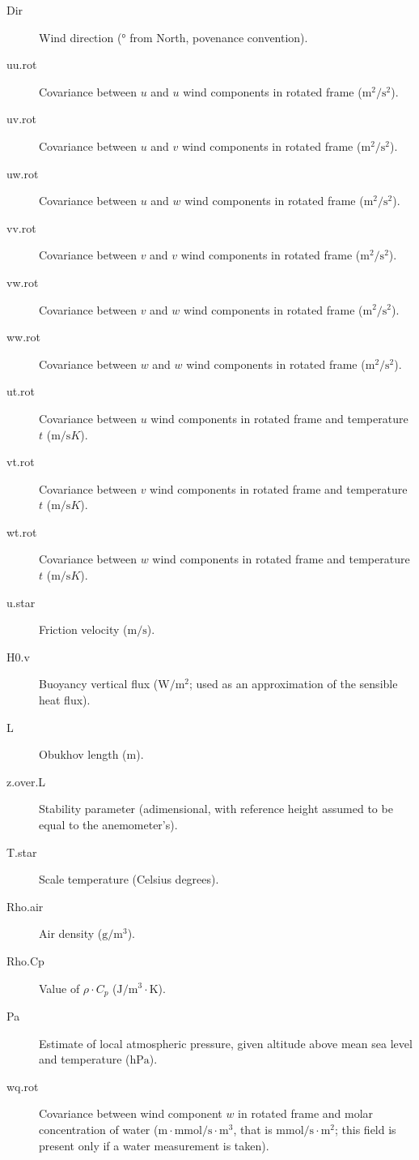 \documentclass[a4paper,10pt]{book}
\begin{document}
\begin{description}
 \item[Dir] Wind direction (° from North, povenance convention).
 \item[uu.rot] Covariance between $u$ and $u$ wind components in rotated frame ($\mbox{m}^2/\mbox{s}^2$).
 \item[uv.rot] Covariance between $u$ and $v$ wind components in rotated frame ($\mbox{m}^2/\mbox{s}^2$).
 \item[uw.rot] Covariance between $u$ and $w$ wind components in rotated frame ($\mbox{m}^2/\mbox{s}^2$).
 \item[vv.rot] Covariance between $v$ and $v$ wind components in rotated frame ($\mbox{m}^2/\mbox{s}^2$).
 \item[vw.rot] Covariance between $v$ and $w$ wind components in rotated frame ($\mbox{m}^2/\mbox{s}^2$).
 \item[ww.rot] Covariance between $w$ and $w$ wind components in rotated frame ($\mbox{m}^2/\mbox{s}^2$).
 \item[ut.rot] Covariance between $u$  wind components in rotated frame and temperature $t$ ($\mbox{m}/\mbox{s} K$).
 \item[vt.rot] Covariance between $v$  wind components in rotated frame and temperature $t$ ($\mbox{m}/\mbox{s} K$).
 \item[wt.rot] Covariance between $w$  wind components in rotated frame and temperature $t$ ($\mbox{m}/\mbox{s} K$).
 \item[u.star] Friction velocity ($\mbox{m}/\mbox{s}$).
 \item[H0.v] Buoyancy vertical flux ($\mbox{W}/\mbox{m}^2$; used as an approximation of the sensible heat flux).
 \item[L] Obukhov length ($\mbox{m}$).
 \item[z.over.L] Stability parameter (adimensional, with reference height assumed to be equal to the anemometer's).
 \item[T.star] Scale temperature (Celsius degrees).
 \item[Rho.air] Air density ($\mbox{g}/\mbox{m}^3$).
 \item[Rho.Cp] Value of $\rho \cdot C_{p}$ ($\mbox{J}/\mbox{m}^{3} \cdot \mbox{K}$).
 \item[Pa] Estimate of local atmospheric pressure, given altitude above mean sea level and temperature ($\mbox{hPa}$).
 \item[wq.rot] Covariance between wind component $w$ in rotated frame and molar concentration of water ($\mbox{m}\cdot\mbox{mmol}/\mbox{s}\cdot\mbox{m}^3$, that is $\mbox{mmol}/\mbox{s}\cdot\mbox{m}^2$; this field is present only if a water measurement is taken).

\end{description}
\end{document}

